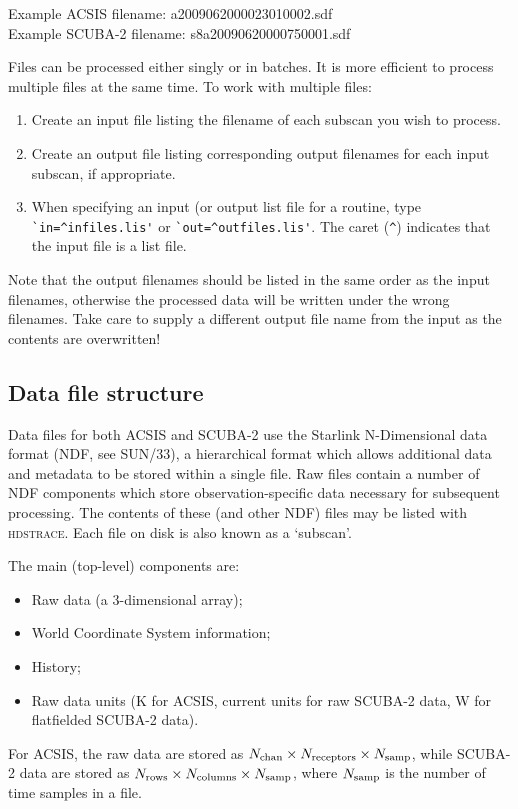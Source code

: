 \documentclass[twoside,11pt]{article}
\newcommand{\xref}[3]{#1}
\renewcommand{\_}{\texttt{\symbol{95}}}
\newcommand{\HDSTRACE}{\textsc{hdstrace}}
\newcommand{\HDSTRACEref}{\xref{\HDSTRACE}{sun102}{}}
\newcommand{\ndfref}{\xref{SUN/33}{sun33}{}}
\begin{document}
Example ACSIS filename: a20090620\_00023\_01\_0002.sdf\\
Example SCUBA-2 filename: s8a20090620\_00075\_0001.sdf

Files can be processed either singly or in batches. It is more
efficient to process multiple files at the same time. To work with
multiple files:
\begin{enumerate}
\item Create an input file listing the filename of each subscan you
  wish to process.
\item Create an output file listing corresponding output filenames for
  each input subscan, if appropriate.
\item When specifying an input (or output list file for a routine,
  type \verb+`in=^infiles.lis'+ or \verb+`out=^outfiles.lis'+. The caret
  (\verb+^+) indicates that the input file is a list file.
\end{enumerate}
Note that the output filenames should be listed in the same order as
the input filenames, otherwise the processed data will be written under
the wrong filenames. Take care to supply a different output file name
from the input as the contents are overwritten!

\subsection{Data file structure}

Data files for both ACSIS and SCUBA-2 use the Starlink N-Dimensional
data format (NDF, see \ndfref), a hierarchical format which allows
additional data and metadata to be stored within a single file. Raw
files contain a number of NDF components which store
observation-specific data necessary for subsequent processing. The
contents of these (and other NDF) files may be listed with
\HDSTRACEref. Each file on disk is also known as a `subscan'.

The main (top-level) components are:
\begin{itemize}
\item Raw data (a 3-dimensional array);
\item World Coordinate System information;
\item History;
\item Raw data units (K for ACSIS, current units for raw SCUBA-2 data,
  W for flatfielded SCUBA-2 data).
\end{itemize}
For ACSIS, the raw data are stored as $N_{\rm chan} \times N_{\rm
  receptors} \times N_{\rm samp}$, while SCUBA-2 data are stored as
$N_{\rm rows} \times N_{\rm columns} \times N_{\rm samp}$, where
$N_{\rm samp}$ is the number of time samples in a file.
\end{document}
